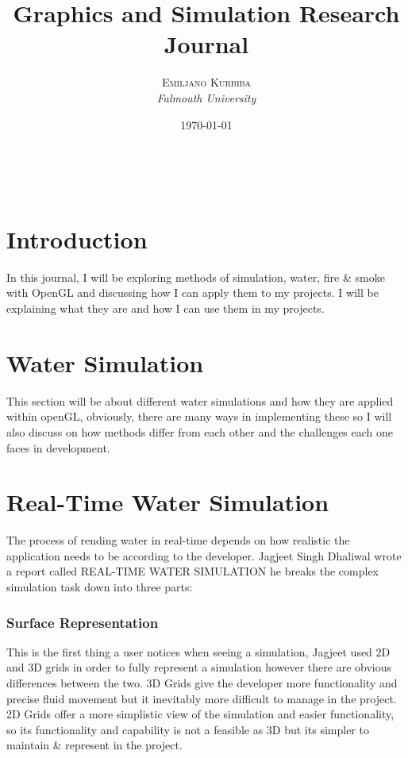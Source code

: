 \documentclass[article, 10pt]{article}
\title{Graphics and Simulation Research Journal}
\author{\textsc{Emiljano Kurbiba} %
\\{\textit{Falmouth University}}} %
\date{\today} %
\makeatletter
\renewcommand{\maketitle}{ 
\begin{flushright} 
{\LARGE\@title} 

\vspace{30pt} 

{\large\@author} 
\\\@date 

\vspace{20pt}
\end{flushright}
}
\makeatother
\begin{document}
\maketitle %

\section*{Introduction}

In this journal, I will be exploring methods of simulation, water, fire \& smoke with OpenGL and discussing how I can apply them to my projects. I will be explaining what they are and how I can use them in my projects.

\section*{Water Simulation}

This section will be about different water simulations and how they are applied within openGL, obviously, there are many ways in implementing these so I will also discuss on how methods differ from each other and the challenges each one faces in development.
\section{Real-Time Water Simulation}
The process of rending water in real-time depends on how realistic the application needs to be according to the developer. Jagjeet Singh Dhaliwal wrote a report called REAL-TIME WATER SIMULATION \cite{dhaliwal2008} he breaks the complex simulation task down into three parts:

\subsubsection*{Surface Representation}

This is the first thing a user notices when seeing a simulation, Jagjeet used 2D and 3D grids in order to fully represent a simulation however there are obvious differences between the two. 3D Grids give the developer more functionality and precise fluid movement but it inevitably more difficult to manage in the project. 2D Grids offer a more simplistic view of the simulation and easier functionality, so its functionality and capability is not a feasible as 3D but its simpler to maintain \& represent in the project.
\end{document}
